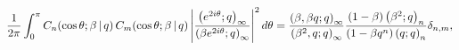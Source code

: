 \[\frac{1}{2\pi}\int_{0}^{\pi}\mathop{C_{n}\/}\nolimits\!\left(\mathop{\cos\/}%
\nolimits\theta;\beta\,|\,q\right)\mathop{C_{m}\/}\nolimits\!\left(\mathop{%
\cos\/}\nolimits\theta;\beta\,|\,q\right)\*\left|\frac{\left(e^{2i\theta};q%
\right)_{\infty}}{\left(\beta e^{2i\theta};q\right)_{\infty}}\right|^{2}d%
\theta=\frac{\left(\beta,\beta q;q\right)_{\infty}}{\left(\beta^{2},q;q\right)%
_{\infty}}\frac{(1-\beta)\left(\beta^{2};q\right)_{n}}{(1-\beta q^{n})\left(q;%
q\right)_{n}}\delta_{n,m},\]